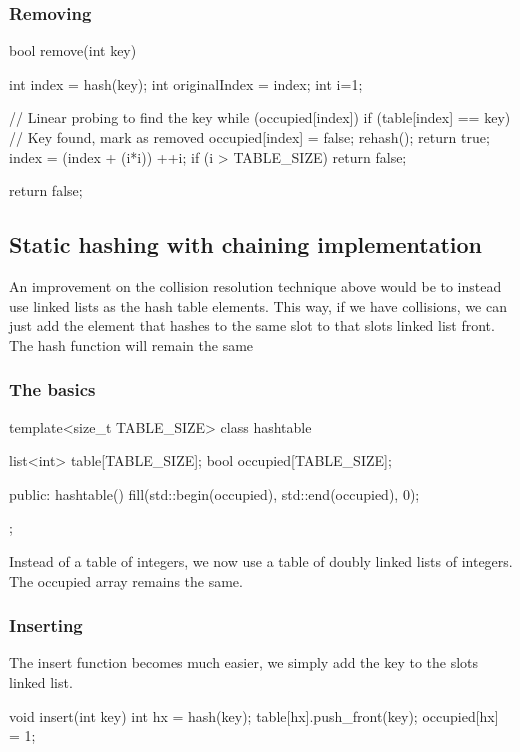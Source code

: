 \documentclass{report}
\begin{document}
\subsubsection{Removing}
\bigbreak \noindent 
\begin{cppcode}
    bool remove(int key) {
        int index = hash(key);
        int originalIndex = index;
        int i=1;

        // Linear probing to find the key
        while (occupied[index]) {
            if (table[index] == key) {
                // Key found, mark as removed
                occupied[index] = false;
                rehash();
                return true;
            }
            index = (index + (i*i)) %
            ++i; if (i > TABLE_SIZE) return false;
        }

        return false;
    }
\end{cppcode}





\pagebreak 
\subsection{Static hashing with chaining implementation}
\bigbreak \noindent 
An improvement on the collision resolution technique above would be to instead use linked lists as the hash table elements. This way, if we have collisions, we can just add the element that hashes to the same slot to that slots linked list front. The hash function will remain the same
\bigbreak \noindent 
\subsubsection{The basics}
\bigbreak \noindent 
\begin{cppcode}
template<size_t TABLE_SIZE>
class hashtable {
    list<int> table[TABLE_SIZE];
    bool occupied[TABLE_SIZE]; 

public:
    hashtable() {
        fill(std::begin(occupied), std::end(occupied), 0);
    }
};
\end{cppcode}
\bigbreak \noindent 
Instead of a table of integers, we now use a table of doubly linked lists of integers. The occupied array remains the same.
\bigbreak \noindent 
\subsubsection{Inserting}
\bigbreak \noindent 
The insert function becomes much easier, we simply add the key to the slots linked list.
\bigbreak \noindent 
\begin{cppcode}
    void insert(int key) {
        int hx = hash(key);
        table[hx].push_front(key);
        occupied[hx] = 1;
    }
\end{cppcode}
\bigbreak \noindent 
\end{document}
